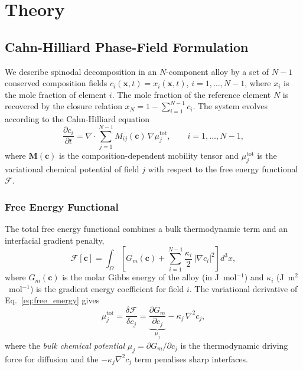 %

\section{Theory}
\label{sec:theory}

\subsection{Cahn-Hilliard Phase-Field Formulation}
\label{sec:ch_formulation}

We describe spinodal decomposition in an $N$-component alloy by a
set of $N-1$ conserved composition fields
$c_i(\bm{x},t) = x_i(\bm{x},t)$, $i = 1,\ldots,N-1$,
where $x_i$ is the mole fraction of element $i$.
The mole fraction of the reference element $N$ is recovered by the
closure relation $x_N = 1 - \sum_{i=1}^{N-1} c_i$.
The system evolves according to the Cahn-Hilliard equation
\begin{equation}
  \frac{\partial c_i}{\partial t}
  = \nabla \cdot \sum_{j=1}^{N-1}
      M_{ij}(\bm{c})\,\nabla\mu_j^{\mathrm{tot}},
  \qquad i = 1,\ldots,N-1,
  \label{eq:CH}
\end{equation}
where $\bm{M}(\bm{c})$ is the composition-dependent mobility tensor
and $\mu_j^{\mathrm{tot}}$ is the variational chemical potential of
field $j$ with respect to the free energy functional $\mathcal{F}$.

\subsubsection{Free Energy Functional}
The total free energy functional combines a bulk thermodynamic term
and an interfacial gradient penalty,
\begin{equation}
  \mathcal{F}[\bm{c}]
  = \int_\Omega \left[
      G_m(\bm{c})
      + \sum_{i=1}^{N-1} \frac{\kappa_i}{2}\,|\nabla c_i|^2
    \right] d^3x,
  \label{eq:free_energy}
\end{equation}
where $G_m(\bm{c})$ is the molar Gibbs energy of the alloy (in
J~mol$^{-1}$) and $\kappa_i$ (J~m$^2$~mol$^{-1}$) is the gradient
energy coefficient for field $i$.  The variational derivative of
Eq.~\eqref{eq:free_energy} gives
\begin{equation}
  \mu_j^{\mathrm{tot}} = \frac{\delta \mathcal{F}}{\delta c_j}
  = \underbrace{\frac{\partial G_m}{\partial c_j}}_{\mu_j}
    - \kappa_j\,\nabla^2 c_j,
  \label{eq:mu_var}
\end{equation}
where the \emph{bulk chemical potential}
$\mu_j = \partial G_m/\partial c_j$
is the thermodynamic driving force for diffusion and the
$-\kappa_j\nabla^2 c_j$ term penalises sharp interfaces.

